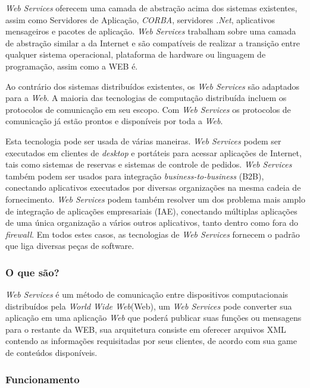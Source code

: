 \documentclass{acm_proc_article-sp}
\begin{document}
		\emph{Web Services} oferecem uma camada de abstração acima dos sistemas existentes, assim como Servidores de Aplicação, \emph{CORBA}, servidores \emph{.Net}, aplicativos mensageiros e pacotes de aplicação. \emph{Web Services} trabalham sobre 
		uma camada de abstração similar a da Internet e são compatíveis de realizar a transição entre qualquer sistema operacional, plataforma de hardware ou linguagem de programação, assim como a WEB é.
		
		Ao contrário dos sistemas distribuídos existentes, os \emph{Web Services} são adaptados para a \emph{Web}. A maioria das tecnologias de computação distribuída incluem os protocolos de comunicação em seu escopo. Com \emph{Web Services} os protocolos de comunicação já estão prontos e disponíveis por toda a \emph{Web}. 
		
		Esta tecnologia pode ser usada de várias maneiras. \emph{Web Services} podem ser executados em clientes de \emph{desktop} e portáteis para acessar aplicações de Internet, tais como sistemas de reservas e sistemas de controle de pedidos. \emph{Web Services} também podem ser usados para integração \emph{business-to-business} (B2B), conectando aplicativos executados por diversas organizações na mesma cadeia de fornecimento. \emph{Web Services} podem também resolver um dos problema mais amplo de integração de aplicações empresariais (IAE), conectando múltiplas aplicações de uma única organização a vários outros aplicativos, tanto dentro como fora do \emph{firewall}. Em todos estes casos, as tecnologias de \emph{Web Services} fornecem o padrão que liga diversas peças de software.\cite{UNDERWEBSERVICES}
		
		\subsubsection{O que são?}
			\emph{Web Services} é um método de comunicação entre dispositivos computacionais distribuídos pela \emph{World Wide Web}(Web), um \emph{Web Services} pode converter sua aplicação em uma aplicação \emph{Web} que poderá publicar suas funções ou mensagens para o restante da WEB, sua arquitetura consiste em oferecer arquivos XML contendo as informações requisitadas por seus clientes, de acordo com sua game de conteúdos disponíveis.\cite{WEBS}
		
		\subsubsection{Funcionamento}
		
\end{document}
